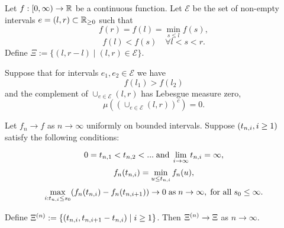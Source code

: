 \begin{lemma} \label{L: Deterministic Lemma}
	Let $f:[0, \infty) \rightarrow \mathbb{R}$ be a continuous function. 
	Let $\mathcal{E}$ be the set of non-empty intervals 
	$e=(l,r) \subset \mathbb{R}_{\geq 0}$
	such that
	\begin{equation} \label{E: f cond 1}
	f(r) = f(l) = \min_{s \leq l} f(s),
	\end{equation}
	\begin{equation} \label{E: f cond 2}
	f(l) < f(s) \quad \forall l < s < r.
	\end{equation}
	Define $\Xi := \lbrace (l, r-l) \; | \; (l, r) \in \mathcal{E} \rbrace$.
	
	Suppose that for intervals $e_1, e_2 \in \mathcal{E}$ we have 
	\begin{equation} \label{E: f cond f(l1) > f(l2)}
	f(l_1) > f(l_2)
	\end{equation}
	and the complement of $\cup_{e \in \mathcal{E}} (l,r)$ has Lebesgue measure zero,
	\begin{equation} \label{E: f cond complement zero}
	\mu \left( \left( \cup_{e \in \mathcal{E}} (l,r) \right)^c\right) = 0.
	\end{equation}
	
	Let $f_n \rightarrow f$ as $n \rightarrow \infty$ uniformly on bounded intervals.
	Suppose $(t_{n, i}, i \geq 1)$ satisfy the following conditions:
	
	\begin{equation} \label{E: fn cond 3}
	0 = t_{n, 1} < t_{n, 2} < ... \; \text{and} \; \lim_{i \rightarrow \infty} t_{n, i} = \infty,
	\end{equation}
	\begin{equation} \label{E: fn cond 4}
	f_n(t_{n, i}) = \min_{u \leq t_{n, i}}f_n(u), 
	\end{equation}
	\begin{equation} \label{E: fn cond 5}
	\max_{i: t_{n, i} \leq s_0}(f_n(t_{n, i}) - f_n(t_{n, i+1})) \rightarrow 0 \; \text{as} \; n \rightarrow \infty, \; \text{for all} \; s_0 \leq \infty.
	\end{equation}
	
	Define $\Xi^{(n)} := \lbrace (t_{n, i}, t_{n, i+1} - t_{n, i}) \; | \; i \geq 1 \rbrace$.
	Then $\Xi^{(n)} \rightarrow \Xi$ as $n \rightarrow \infty$.
\end{lemma}

